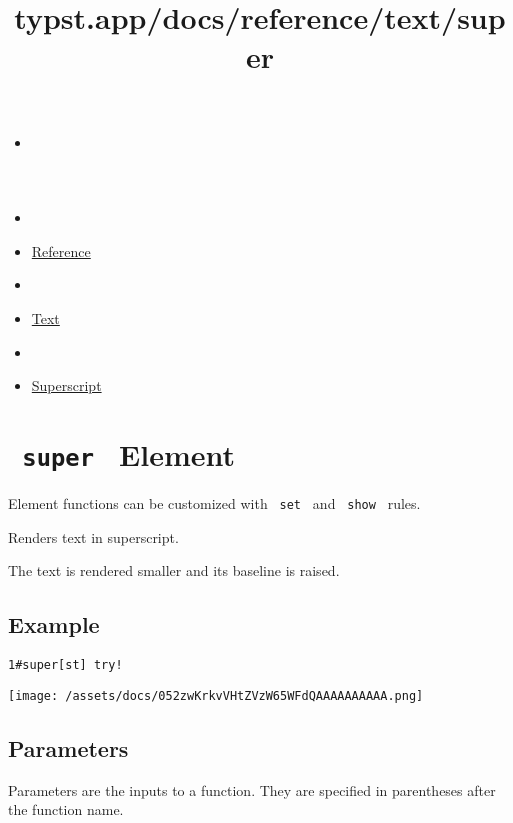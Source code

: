 \title{typst.app/docs/reference/text/super}

\begin{itemize}
\tightlist
\item
  \href{/docs}{}
\item
  
\item
  \href{/docs/reference/}{Reference}
\item
  
\item
  \href{/docs/reference/text/}{Text}
\item
  
\item
  \href{/docs/reference/text/super/}{Superscript}
\end{itemize}

\section{\texorpdfstring{\texttt{\ super\ } {{ Element
}}}{ super   Element }}\label{summary}

\label{element-tooltip}
Element functions can be customized with \texttt{\ set\ } and
\texttt{\ show\ } rules.

Renders text in superscript.

The text is rendered smaller and its baseline is raised.

\subsection{Example}\label{example}

\begin{verbatim}
1#super[st] try!
\end{verbatim}

\texttt{[image: /assets/docs/052zwKrkvVHtZVzW65WFdQAAAAAAAAAA.png]}

\subsection{\texorpdfstring{{ Parameters
}}{ Parameters }}\label{parameters}

\label{parameters-tooltip}
Parameters are the inputs to a function. They are specified in
parentheses after the function name.

